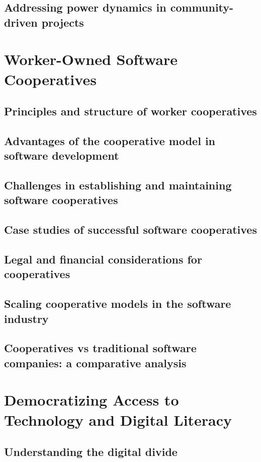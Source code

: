 \subsection{Addressing power dynamics in community-driven projects}

\newpage

\section{Worker-Owned Software Cooperatives}
\subsection{Principles and structure of worker cooperatives}
\subsection{Advantages of the cooperative model in software development}
\subsection{Challenges in establishing and maintaining software cooperatives}
\subsection{Case studies of successful software cooperatives}
\subsection{Legal and financial considerations for cooperatives}
\subsection{Scaling cooperative models in the software industry}
\subsection{Cooperatives vs traditional software companies: a comparative analysis}

\newpage

\section{Democratizing Access to Technology and Digital Literacy}
\subsection{Understanding the digital divide}
